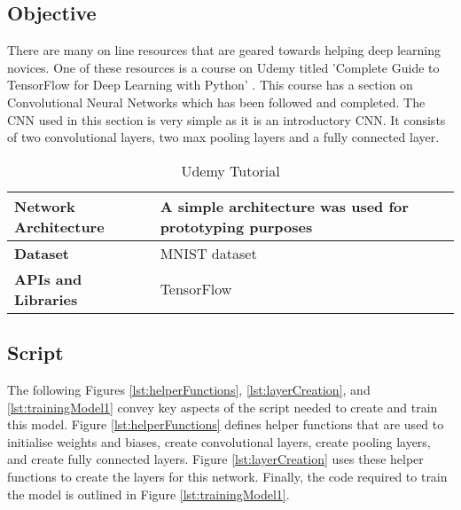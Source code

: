 \tocless\subsection{Objective}
There are many on line resources that are geared towards helping deep learning novices.
One of these resources is a course on Udemy titled 'Complete Guide to TensorFlow for Deep Learning with Python' \parencite{udemy}.
This course has a section on Convolutional Neural Networks which has been followed and completed.
The CNN used in this section is very simple as it is an introductory CNN.
It consists of two convolutional layers, two max pooling layers and a fully connected layer.

\begin{table}[h]
\centering
\caption{Udemy Tutorial}
\label{my-label}
\begin{tabular}{|l|p{8cm}|}
\hline
\textbf{Network Architecture} & A simple architecture was used for prototyping purposes            \\ \hline
\textbf{Dataset}              & MNIST dataset \\ \hline
\textbf{APIs and Libraries}   & TensorFlow                                                         \\ \hline
\end{tabular}
\end{table}

\tocless\subsection{Script}
The following Figures \ref{lst:helperFunctions}, \ref{lst:layerCreation}, and \ref{lst:trainingModel1} convey key aspects of the script needed to create and train this model.
Figure \ref{lst:helperFunctions} defines helper functions that are used to initialise weights and biases, create convolutional layers, create pooling layers, and create fully connected layers.
Figure \ref{lst:layerCreation} uses these helper functions to create the layers for this network.
Finally, the code required to train the model is outlined in Figure \ref{lst:trainingModel1}.


